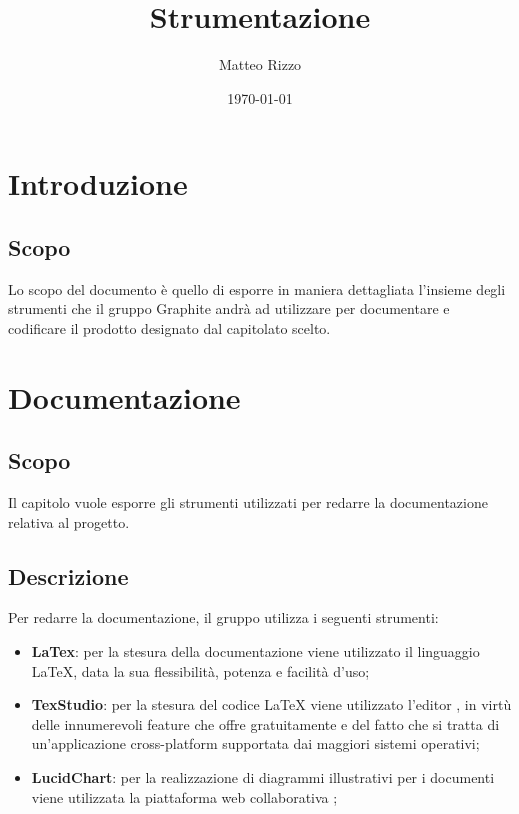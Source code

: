 \documentclass[openany,12pt,a4paper]{report}
\title{Strumentazione}
\author{Matteo Rizzo}
\date{\today}
\begin{document}
\maketitle

 
\tableofcontents{}


\chapter{Introduzione}

\section{Scopo}

Lo scopo del documento è quello di esporre in maniera dettagliata l'insieme degli strumenti che il gruppo Graphite andrà ad utilizzare per documentare e codificare il prodotto designato dal capitolato scelto.


\chapter{Documentazione}

\section{Scopo}

Il capitolo vuole esporre gli strumenti utilizzati per redarre la documentazione relativa al progetto. 

\section{Descrizione}

Per redarre la documentazione, il gruppo utilizza i seguenti strumenti:

\begin{itemize}
    \item \textbf{LaTex}: per la stesura della documentazione viene utilizzato il linguaggio \LaTeX{}, data la sua flessibilità, potenza e facilità d'uso;
    \item \textbf{TexStudio}: per la stesura del codice \LaTeX{} viene utilizzato l’editor , in virtù delle innumerevoli feature che offre gratuitamente e del fatto che si tratta di un'applicazione cross-platform supportata dai maggiori sistemi operativi;
    \item \textbf{LucidChart}: per la realizzazione di diagrammi illustrativi per i documenti viene utilizzata la piattaforma web collaborativa ;
\end{itemize}
\end{document}
